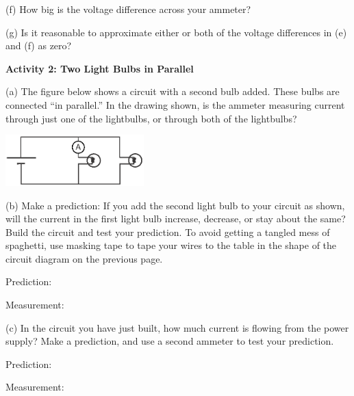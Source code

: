 (f) How big is the voltage difference across your ammeter?  
\answerspace{0.6 in}



(g) Is it reasonable to approximate either or both of the voltage differences in (e) and (f) as zero?
\answerspace{0.6 in}



\textbf{Activity 2: Two Light Bulbs in Parallel}

(a) The figure below shows a circuit with a second bulb added.  These bulbs are connected ``in parallel.''  In the drawing shown, is the ammeter measuring current through just one of the lightbulbs, or through both of the lightbulbs?
\vspace{-0.1in}
\begin{flushright}
\includegraphics[width=0.4\textwidth]{electric_circuits/circ_diag3.eps}
\end{flushright}
\vspace{-0.1in}


\pagebreak[2]
(b) Make a prediction: If you add the second light bulb to your circuit as shown, will the current in the first light bulb increase, decrease, or stay about the same?  Build the circuit and test your prediction. To avoid getting a tangled mess of spaghetti, use masking tape to tape your wires to the table in the shape of the circuit diagram on the previous page.\par
\vspace{0.1 in}
\hspace{0.5 in} Prediction:  \par
\vspace{0.2 in}
\hspace{0.5 in} Measurement:  \par
\vspace{0.25 in}

(c)  In the circuit you have just built, how much current is flowing from the power supply?  Make a prediction, and use a second ammeter to test your prediction. \par
\vspace{0.1 in}
\hspace{0.5 in} Prediction:   \par
\vspace{0.2 in}
\hspace{0.5 in} Measurement:  \par
\vspace{0.25 in}

